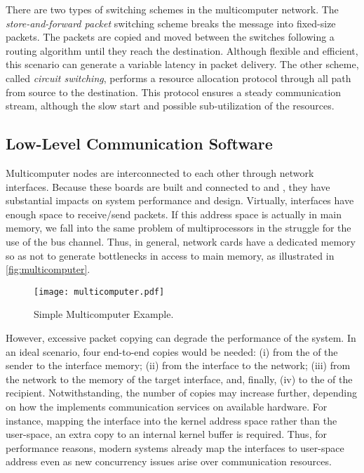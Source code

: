 			There are two types of switching schemes in the multicomputer network.
			The \textit{store-and-forward packet} switching scheme breaks the message
			into fixed-size packets.
			The packets are copied and moved between the switches following a
			routing algorithm until they reach the destination.
			Although flexible and efficient, this scenario can generate a variable
			latency in packet delivery.
			The other scheme, called \textit{circuit switching}, performs a resource
			allocation protocol through all path from source to the destination.
			This protocol ensures a steady communication stream, although the
			slow start and possible sub-utilization of the resources.

		\subsection{Low-Level Communication Software}
		\label{sec.multicomputers-low-sw}

			Multicomputer nodes are interconnected to each other through network interfaces.
			Because these boards are built and connected to \cpus and \ram,
			they have substantial impacts on system performance and \os design.
			Virtually, interfaces have enough \ram space to receive/send packets.
			If this address space is actually in main memory, we fall into the same
			problem of multiprocessors in the struggle for the use of the bus channel.
			Thus, in general, network cards have a dedicated memory so as not to
			generate bottlenecks in access to main memory, as illustrated in \autoref{fig:multicomputer}.

			\begin{figure}[!tb]
				\centering%
				\caption{Simple Multicomputer Example.}%
				\label{fig:multicomputer}%
				\texttt{[image: multicomputer.pdf]}%
			\end{figure}

			However, excessive packet copying can degrade the performance of the system.
			In an ideal scenario, four end-to-end copies would be needed:
			(i) from the \ram of the sender to the interface memory;
			(ii) from the interface to the network;
			(iii) from the network to the memory of the target interface, and, finally,
			(iv) to the \ram of the recipient.
			Notwithstanding, the number of copies may increase further, depending on
			how the \os implements communication services on available hardware.
			For instance, mapping the interface into the kernel address space
			rather than the user-space, an extra copy to an internal kernel
			buffer is required.
			Thus, for performance reasons, modern systems already map the interfaces
			to user-space address even as new concurrency issues arise over
			communication resources.

